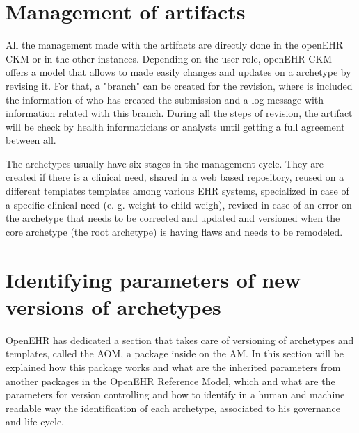 \documentclass[mim_thesis.tex]{subfiles}
\begin{document}
\section{Management of artifacts}

All the management made with the artifacts are directly done in the openEHR CKM or in the other instances. Depending on the user role, openEHR CKM offers a model that allows to made easily changes and updates on a archetype by revising it. For that, a "branch" can be created for the revision, where is included the information of who has created the submission and a log message with information related with this branch. During all the steps of revision, the artifact will be check by health informaticians or analysts until getting a full agreement between all. 

The archetypes usually have six stages in the management cycle. They are created if there is a clinical need, shared in a web based repository, reused on a different templates templates among various EHR systems, specialized in case of a specific clinical need (e. g. weight to child-weigh), revised in case of an error on the archetype that needs to be corrected and updated and versioned when the core archetype (the root archetype) is having flaws and needs to be remodeled. \citep{article2006leslie}


\section{Identifying parameters of new versions of archetypes}

OpenEHR has dedicated a section that takes care of versioning of archetypes and templates, called the \ac{AOM}, a package inside on the \ac{AM}. In this section will be explained how this package works and what are the inherited parameters from another packages in the OpenEHR Reference Model, which and what are the parameters for version controlling and how to identify in a human and machine readable way the identification of each archetype, associated to his governance and life cycle. 
\end{document}
